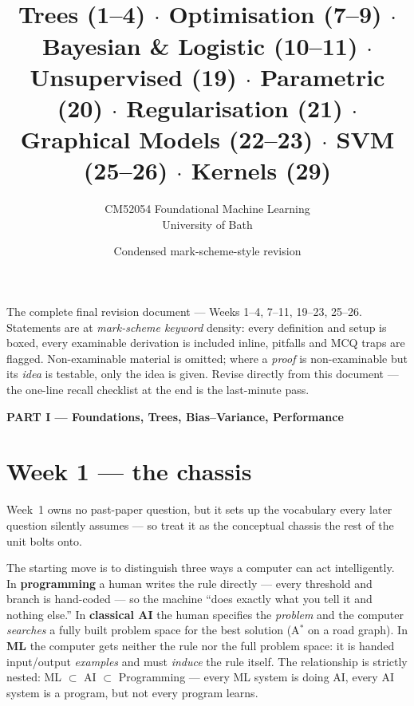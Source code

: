 \documentclass[11pt, a4paper]{article}
\title{\vspace{-1.2cm}{\Huge\bfseries Combined Revision Notes} \\[0.4em]{\large Trees (1–4) $\cdot$ Optimisation (7–9) $\cdot$ Bayesian \& Logistic (10–11) $\cdot$ Unsupervised (19) $\cdot$ Parametric (20) $\cdot$ Regularisation (21) $\cdot$ Graphical Models (22–23) $\cdot$ SVM (25–26) $\cdot$ Kernels (29)}}
\author{\large CM52054 Foundational Machine Learning \\[0.2em]\normalsize University of Bath}
\date{Condensed mark-scheme-style revision}
\newcommand{\kw}[1]{\textbf{#1}}
\begin{document}
\maketitle
\thispagestyle{empty}

\begin{tldrbox}
The complete final revision document — Weeks 1–4, 7–11, 19–23, 25–26. Statements are at
\emph{mark-scheme keyword} density: every definition and setup is boxed, every examinable derivation
is included inline, pitfalls and MCQ traps are flagged. Non-examinable material is omitted; where a
\emph{proof} is non-examinable but its \emph{idea} is testable, only the idea is given. Revise
directly from this document — the one-line recall checklist at the end is the last-minute pass.
\end{tldrbox}

\begin{center}\large\bfseries\color{defBd} PART I — Foundations, Trees, Bias–Variance, Performance\end{center}

\section{Week 1 — the chassis}

Week~1 owns no past-paper question, but it sets up the vocabulary every later question silently
assumes — so treat it as the conceptual chassis the rest of the unit bolts onto.

The starting move is to distinguish three ways a computer can act intelligently. In
\kw{programming} a human writes the rule directly — every threshold and branch is hand-coded — so the
machine ``does exactly what you tell it and nothing else.'' In \kw{classical AI} the human specifies
the \emph{problem} and the computer \emph{searches} a fully built problem space for the best solution
(A$^\ast$ on a road graph). In \kw{ML} the computer gets neither the rule nor the full problem space:
it is handed input/output \emph{examples} and must \emph{induce} the rule itself. The relationship is
strictly nested: ML $\subset$ AI $\subset$ Programming — every ML system is doing AI, every AI system
is a program, but not every program learns.
\end{document}
